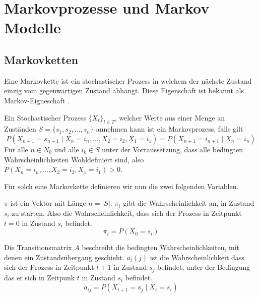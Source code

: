 \section{Markovprozesse und Markov Modelle}

\subsection{Markovketten}
Eine Markovkette ist ein stochastischer Prozess in welchem der nächste Zustand einzig vom gegenwärtigen Zustand abhängt. Diese Eigenschaft ist bekannt als Markov-Eigneschaft \cite{StochasticProcesses}.
\begin{definition}[Markovkette]

    Ein Stochastischer Prozess $\{X_t\}_{t \in T}$, welcher Werte aus einer Menge an Zuständen $S = \{s_1, s_2, \dots, s_n\}$ annehmen kann ist ein Markovprozess, falls gilt
    \begin{equation}
        P(X_{n+1}=s_{n+1} \mid X_{n} = i_{n}, \dots, X_2=i_2, X_1=i_1) = P(X_{n+1}=i_{n+1} \mid X_{n} = i_{n})
    \end{equation}
    Für alle $n \in N_0$ und alle $i_k \in S$ unter der Vorraussetzung, dass alle bedingten Wahrscheinlichkeiten Wohldefiniert sind, also $P(X_{n} = i_{n}, \dots, X_2=i_2, X_1=i_1) > 0$.
\end{definition}

Für solch eine Markovkette definieren wir nun die zwei folgenden Variablen.

\begin{definition}[Startwahrscheinlichkeitsvektor $pi$]

    $\pi$ ist ein Vektor mit Länge $n= |S|$. $\pi_i$ gibt die Wahrscheinlichkeit an, in Zustand $s_i$ zu starten. Also die Wahrscheinlichkeit, dass sich der Prozess in Zeitpunkt $t=0$ in Zustand $s_i$ befindet.
    \begin{equation}
        \pi_i = P(X_0 = s_i)
    \end{equation}
\end{definition}
\begin{definition}[Transitionsmatrix $A$]

    Die Transitionsmatrix $A$ beschreibt die bedingten Wahrscheinlichkeiten, mit denen ein Zustandsübergang geschieht. $a_i(j)$ ist die Wahrscheinlichkeit dass sich der Prozess in Zeitpunkt $t+1$ in Zustand $s_j$ befindet, unter der Bedingung das er sich in Zeitpunk $t$ in Zustand $s_i$ befindet.
    \begin{equation}
        a_{ij} = P(X_{t+1} = s_j \mid X_t = s_i)
    \end{equation}
\end{definition}

